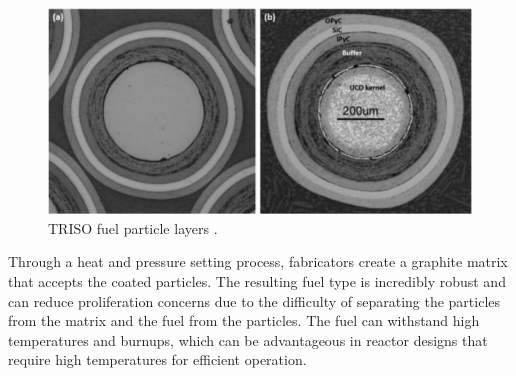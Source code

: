 \begin{figure}[H]
    \centering
    \includegraphics[scale=0.98]{images/triso_review/triso_layers.pdf}
    \caption{TRISO fuel particle layers \cite{particle_review_2019}.}
    \label{fig:triso_layers}
\end{figure}

Through a heat and pressure setting process, fabricators create a graphite
matrix that accepts the coated particles.
The resulting fuel type is incredibly robust and can reduce proliferation
concerns due to the difficulty of separating the particles from the matrix and the fuel from the particles. The fuel can withstand high temperatures and burnups, which can be advantageous in reactor designs that require high temperatures for efficient operation.